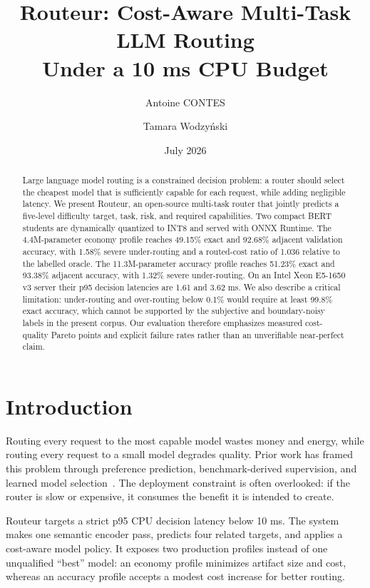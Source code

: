 \documentclass[10pt,twocolumn]{article}
\title{Routeur: Cost-Aware Multi-Task LLM Routing\\Under a 10 ms CPU Budget}
\author{Antoine CONTES \and Tamara Wodzyński}
\date{July 2026}
\begin{document}
\maketitle

\begin{abstract}
Large language model routing is a constrained decision problem: a router should
select the cheapest model that is sufficiently capable for each request, while
adding negligible latency. We present Routeur, an open-source multi-task router
that jointly predicts a five-level difficulty target, task, risk, and required
capabilities. Two compact BERT students are dynamically quantized to INT8 and
served with ONNX Runtime. The 4.4M-parameter economy profile reaches 49.15\%
exact and 92.68\% adjacent validation accuracy, with 1.58\% severe
under-routing and a routed-cost ratio of 1.036 relative to the labelled oracle.
The 11.3M-parameter accuracy profile reaches 51.23\% exact and 93.38\%
adjacent accuracy, with 1.32\% severe under-routing. On an Intel Xeon E5-1650
v3 server their p95 decision latencies are 1.61 and 3.62 ms. We also describe a
critical limitation: under-routing and over-routing below 0.1\% would require at
least 99.8\% exact accuracy, which cannot be supported by the subjective and
boundary-noisy labels in the present corpus. Our evaluation therefore emphasizes
measured cost-quality Pareto points and explicit failure rates rather than an
unverifiable near-perfect claim.
\end{abstract}

\section{Introduction}
Routing every request to the most capable model wastes money and energy, while
routing every request to a small model degrades quality. Prior work has framed
this problem through preference prediction, benchmark-derived supervision, and
learned model selection~\cite{routellm,routerbench}. The deployment constraint is
often overlooked: if the router is slow or expensive, it consumes the benefit it
is intended to create.

Routeur targets a strict p95 CPU decision latency below 10 ms. The system makes
one semantic encoder pass, predicts four related targets, and applies a
cost-aware model policy. It exposes two production profiles instead of one
unqualified ``best'' model: an economy profile minimizes artifact size and cost,
whereas an accuracy profile accepts a modest cost increase for better routing.
\end{document}
